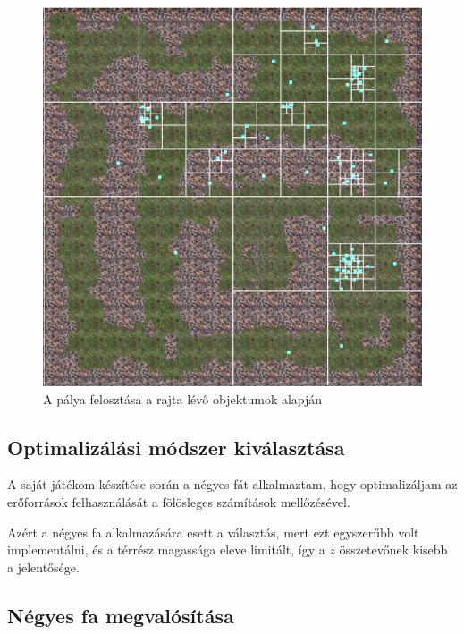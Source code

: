 \begin{figure}[h]
\centering
\includegraphics[scale=0.22]{kepek/quadtree.png}
\caption{A pálya felosztása a rajta lévő objektumok alapján}
\label{fig:quadtree}
\end{figure}

\subsection{Optimalizálási módszer kiválasztása}

A saját játékom készítése során a négyes fát alkalmaztam, hogy optimalizáljam az erőforrások felhasználását a fölösleges számítások mellőzésével.

Azért a négyes fa alkalmazására esett a választás, mert ezt egyszerűbb volt implementálni, és a térrész magassága eleve limitált, így a $z$ összetevőnek kisebb a jelentősége.

\subsection{Négyes fa megvalósítása}


